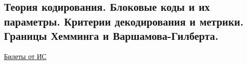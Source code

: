 \subsection{Теория кодирования. Блоковые коды и их параметры. Критерии декодирования и метрики. Границы Хемминга и Варшамова-Гилберта.}

\href{https://docs.google.com/document/d/1Q9Q3T_WhroC04ByS0BtFDbvEZ6DrQbuFPd7fAl2XSWM/edit#heading=h.y6j1v1w9p3kd}{Билеты от ИС}
